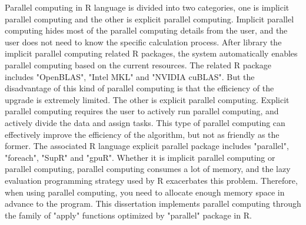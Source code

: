 \documentclass[a4paper,12pt,titlepage]{article} %
\numberwithin{equation}{section}  %
\begin{document}
	Parallel computing in R language is divided into two categories, one is implicit parallel computing and the other is explicit parallel computing. Implicit parallel computing hides most of the parallel computing details from the user, and the user does not need to know the specific calculation process. After library the implicit parallel computing related R packages, the system automatically enables parallel computing based on the current resources. The related R package includes "OpenBLAS", "Intel MKL" and "NVIDIA cuBLAS". But the disadvantage of this kind of parallel computing is that the efficiency of the upgrade is extremely limited. The other is explicit parallel computing. Explicit parallel computing requires the user to actively run parallel computing, and actively divide the data and assign tasks. This type of parallel computing can effectively improve the efficiency of the algorithm, but not as friendly as the former. The associated R language explicit parallel package includes "parallel", "foreach", "SupR" and "gpuR". Whether it is implicit parallel computing or parallel computing, parallel computing consumes a lot of memory, and the lazy evaluation programming strategy used by R exacerbates this problem. Therefore, when using parallel computing, you need to allocate enough memory space in advance to the program. This dissertation implements parallel computing through the family of "apply" functions optimized by "parallel" package in R.
	
\end{document}
